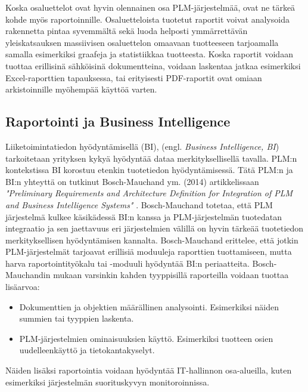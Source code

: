 Koska osaluettelot ovat hyvin olennainen osa PLM-järjestelmää, ovat ne tärkeä kohde myös raportoinnille. \cite{german_challenge_2016} Osaluetteloista tuotetut raportit voivat analysoida rakennetta pintaa syvemmältä sekä luoda helposti ymmärrettävän yleiskatsauksen massiivisen osaluettelon omaavaan tuotteeseen tarjoamalla samalla esimerkiksi graafeja ja statistiikkaa tuotteesta. Koska raportit voidaan tuottaa erillisinä sähköisinä dokumentteina, voidaan laskentaa jatkaa esimerkiksi Excel-raporttien tapauksessa, tai erityisesti PDF-raportit ovat omiaan arkistoinnille myöhempää käyttöä varten.

\subsection{Raportointi ja Business Intelligence} \label{Raportointi ja Business Intelligence}

Liiketoimintatiedon hyödyntämisellä (BI), (engl. \textit{Business Intelligence, BI}) tarkoitetaan yrityksen kykyä hyödyntää dataa merkityksellisellä tavalla. PLM:n kontekstissa BI korostuu etenkin tuotetiedon hyödyntämisessä. Tätä PLM:n ja BI:n yhteyttä on tutkinut Bosch-Mauchand ym. (2014) artikkelissaan \textit{"Preliminary Requirements and Architecture Definition for Integration of PLM and Business Intelligence Systems"}  \cite{bayro-corrochano_preliminary_2014}. Bosch-Mauchand totetaa, että PLM järjestelmä kulkee käsikädessä BI:n kanssa ja PLM-järjestelmän tuotedatan integraatio ja sen jaettavuus eri järjestelmien välillä on hyvin tärkeää tuotetiedon merkityksellisen hyödyntämisen kannalta.
Bosch-Mauchand erittelee, että jotkin PLM-järjestelmät tarjoavat erillisiä moduuleja raporttien tuottamiseen, mutta harva raportointityökalu tai -moduuli hyödyntää BI:n periaatteita. Bosch-Mauchandin mukaan varsinkin kahden tyyppisillä raporteilla voidaan tuottaa lisäarvoa:  \cite{bayro-corrochano_preliminary_2014}
\begin{itemize}
\item Dokumenttien ja objektien määrällinen analysointi. Esimerkiksi näiden summien tai tyyppien laskenta.
\item PLM-järjestelmien ominaisuuksien käyttö. Esimerkiksi tuotteen osien uudelleenkäyttö ja tietokantakyselyt.
\end{itemize}
Näiden lisäksi raportointia voidaan hyödyntää IT-hallinnon osa-alueilla, kuten esimerkiksi järjestelmän suorituskyvyn monitoroinnissa.

